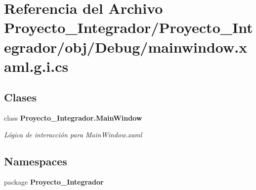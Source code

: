 \section{Referencia del Archivo Proyecto\-\_\-\-Integrador/\-Proyecto\-\_\-\-Integrador/obj/\-Debug/mainwindow.xaml.\-g.\-i.\-cs}
\label{mainwindow_8xaml_8g_8i_8cs}
\subsection*{Clases}
\begin{DoxyCompactItemize}
\item 
class {\bf Proyecto\-\_\-\-Integrador.\-Main\-Window}
\begin{DoxyCompactList}\small\item\em Lógica de interacción para Main\-Window.\-xaml \end{DoxyCompactList}\end{DoxyCompactItemize}
\subsection*{Namespaces}
\begin{DoxyCompactItemize}
\item 
package {\bf Proyecto\-\_\-\-Integrador}
\end{DoxyCompactItemize}
